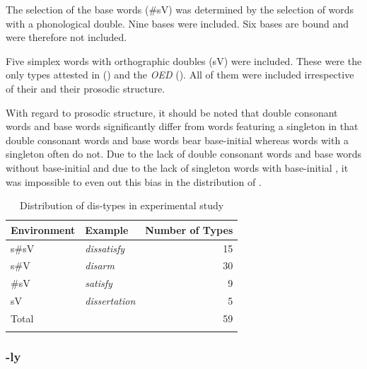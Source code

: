 The selection of the base words (\#sV) was determined by the selection of words with a phonological double. 
Nine bases were included. Six bases are bound and were therefore not included. 

Five simplex words with orthographic doubles (sV) were included. These were the only types attested in  (\citealt{Davies.20082014}) and the \textit{OED} (\citealt{OED.2013}). 
All of them were included irrespective of their  and their prosodic structure. 

With regard to prosodic structure, it should be noted that double consonant words and base words significantly differ from words featuring a singleton in that double consonant words and base words bear base-initial  whereas words with a singleton often do not. Due to the lack of double consonant words and base words without base-initial  and due to the lack of singleton words with base-initial , it was impossible to even out this bias in the distribution of .


\begin{table}[h!]
	\caption{Distribution of dis-types in experimental study}
	\label{tbl:distribution of dis types in experiment}

	
		\begin{tabular} {llr}
\lsptoprule
			Environment & Example & Number of  Types\\

			\midrule
			s\#sV&\color{lsMidBlue}\textit{dissatisfy} & 15 \\ 
			s\#V&\color{lsMidBlue}\textit{disarm} & 30\\ 
			\#sV&\color{lsMidBlue}\textit{satisfy} & 9\\ 
			sV&\color{lsMidBlue}\textit{dissertation} & 5 \\ 
			\midrule   	
			Total&  & 59\\ 
			\lspbottomrule                                                                                
		\end{tabular}
	
\end{table}



\subsubsection{-ly} \label{stimuli ly}


